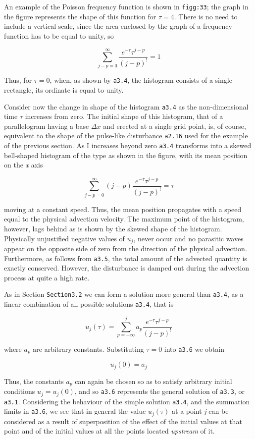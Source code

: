 An example of the Poisson frequency function is shown in
\texttt{figg:33}; the graph in the figure represents the shape of this
function for \(\tau = 4\). There is no need to include a vertical scale,
since the area enclosed by the graph of a frequency function has to be
equal to unity, so

 \[\sum_{j - p = 0}^{\infty}\frac{e^{- \tau}\tau^{j - p}}{\left( j - p \right)^{!}} = 1\]

Thus, for \(\tau = 0\), when, as shown by \texttt{a3.4}, the histogram
consists of a single rectangle, its ordinate is equal to unity.

Consider now the change in shape of the histogram \texttt{a3.4} as the
non-dimensional time \(\tau\) increases from zero. The initial shape of
this histogram, that of a parallelogram having a base \(\Delta x\) and
erected at a single grid point, is, of course, equivalent to the shape
of the pulse-like disturbance \texttt{a2.16} used for the example of the
previous section. As I increases beyond zero \texttt{a3.4} transforms
into a skewed bell-shaped histogram of the type as shown in the figure,
with its mean position on the \emph{x} axis

\[\sum_{j - p = 0}^{\infty}\left( j - p \right)\frac{e^{- \tau}\tau^{j - p}}{\left( j - p \right)^{!}} = \tau\]

moving at a constant speed. Thus, the mean position propagates with a
speed equal to the physical advection velocity. The maximum point of the
histogram, however, lags behind as is shown by the skewed shape of the
histogram. Physically unjustified negative values of \(u_{j}\), never
occur and no parasitic waves appear on the opposite side of zero from
the direction of the physical advection. Furthermore, as follows from
\texttt{a3.5}, the total amount of the advected quantity is exactly
conserved. However, the disturbance is damped out during the advection
process at quite a high rate.

As in Section \texttt{Section3.2} we can form a solution more general
than \texttt{a3.4}, as a linear combination of all possible solutions
\texttt{a3.4}, that is

 \[u_{j}\left( \tau \right) = \sum_{p = - \infty}^{j}a_{p}\frac{e^{- \tau}\tau^{j - p}}{\left( j - p \right)^{!}}\]

where \(a_{p}\) are arbitrary constants. Substituting \(\tau = 0\) into
\texttt{a3.6} we obtain

 \[u_{j}\left( 0 \right) = a_{j}\]

Thus, the constants \(a_{p}\) can again be chosen so as to satisfy
arbitrary initial conditions \(u_{j} = u_{j}(0)\), and so \texttt{a3.6}
represents the general solution of \texttt{a3.3}, or \texttt{a3.1}.
Considering the behaviour of the simple solution \texttt{a3.4}, and the
summation limits in \texttt{a3.6}, we see that in general the value
\(u_{j}\left( \tau \right)\) at a point \emph{j} can be considered as a
result of superposition of the effect of the initial values at that
point and of the initial values at all the points located
\emph{upstream} of it.

